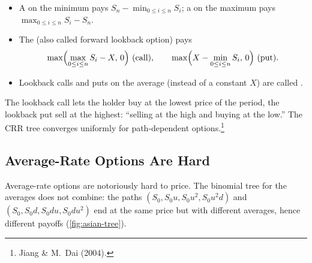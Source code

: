 
\begin{definition}
	\begin{itemize}[nosep]
		\item A  on the minimum pays $S_{n}-\min_{0\le i\le n}S_{i}$; a  on the maximum pays $\max_{0\le i\le n}S_{i}-S_{n}$.
		\item The  (also called forward lookback option) pays
		      \[
			      \max\Bigl(\max_{0\le i\le n}S_{i}-X,\,0\Bigr)\ \text{(call)},
			      \qquad
			      \max\Bigl(X-\min_{0\le i\le n}S_{i},\,0\Bigr)\ \text{(put)}.
		      \]
		\item Lookback calls and puts on the average (instead of a constant $X$) are called .
	\end{itemize}
\end{definition}

\suppstart
{}

The lookback call lets the holder buy at the lowest price of the period, the lookback put sell at the highest: ``selling at the high and buying at the low.''
\suppend
The CRR tree converges uniformly for path-dependent options.\footnote{Jiang \& M.~Dai (2004).}

\suppstart
{}
\suppend

\subsection{Average-Rate Options Are Hard}


Average-rate options are notoriously hard to price.
The binomial tree for the averages does not combine: the paths $(S_{0},S_{0}u,S_{0}u^{2},S_{0}u^{2}d)$ and $(S_{0},S_{0}d,S_{0}du,S_{0}du^{2})$ end at the same price but with different averages, hence different payoffs (\autoref{fig:asian-tree}).

\suppstart
{}

